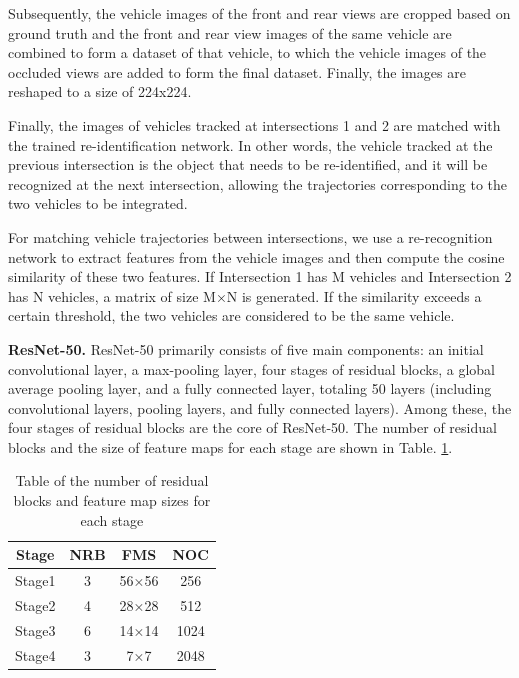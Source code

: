 \documentclass[lettersize,journal]{IEEEtran}
\begin{document}
Subsequently, the vehicle images of the front and rear views are cropped based on ground truth and the front and rear view images of the same vehicle are combined to form a dataset of that vehicle, to which the vehicle images of the occluded views are added to form the final dataset.
Finally, the images are reshaped to a size of 224x224.

Finally, the images of vehicles tracked at intersections 1 and 2 are matched with the trained re-identification network.
In other words, the vehicle tracked at the previous intersection is the object that needs to be re-identified, and it will be recognized at the next intersection, allowing the trajectories corresponding to the two vehicles to be integrated.

For matching vehicle trajectories between intersections, we use a re-recognition network to extract features from the vehicle images and then compute the cosine similarity of these two features.
If Intersection 1 has M vehicles and Intersection 2 has N vehicles, a matrix of size M×N is generated. 
If the similarity exceeds a certain threshold, the two vehicles are considered to be the same vehicle.

\textbf{ResNet-50.}
ResNet-50 primarily consists of five main components: an initial convolutional layer, a max-pooling layer, four stages of residual blocks, a global average pooling layer, and a fully connected layer, totaling 50 layers (including convolutional layers, pooling layers, and fully connected layers). 
Among these, the four stages of residual blocks are the core of ResNet-50. 
The number of residual blocks and the size of feature maps for each stage are shown in Table. \ref{tab:1}.

\begin{table}[t]
	\centering
	\caption{Table of the number of residual blocks and feature map sizes for each stage}
	\label{tab:1}
	\begin{tabular}{|c|c|c|c|}
		\hline
		\multicolumn{1}{|c|}{Stage} & \multicolumn{1}{c|}{NRB} & \multicolumn{1}{c|}{FMS} & \multicolumn{1}{c|}{NOC} \\
		\hline
		Stage1 & 3 & 56×56 & 256 \\
		\hline
		Stage2 & 4 & 28×28 & 512 \\
		\hline
		Stage3 & 6 & 14×14 & 1024 \\
		\hline
		Stage4 & 3 & 7×7 & 2048 \\
		\hline
	\end{tabular}
\end{table}
\end{document}
